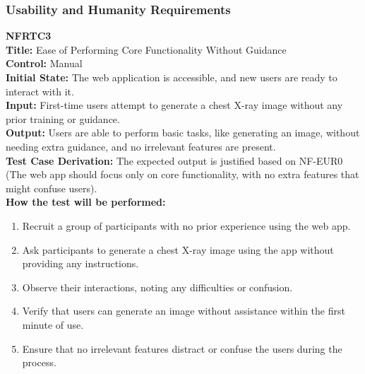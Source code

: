 \documentclass[12pt, titlepage]{article}
\begin{document}
\subsubsection{Usability and Humanity Requirements}
\textbf{NFRTC3}\\
\textbf{Title:} Ease of Performing Core Functionality Without Guidance\\
\textbf{Control:} Manual\\
\textbf{Initial State:} The web application is accessible, and new users are ready to interact with it.\\
\textbf{Input:} First-time users attempt to generate a chest X-ray image without any prior training or guidance.\\
\textbf{Output:} Users are able to perform basic tasks, like generating an image, without needing extra guidance, and no irrelevant features are present.\\
\textbf{Test Case Derivation:} The expected output is justified based on NF-EUR0 (The web app should focus only on core functionality, with no extra features that might confuse users).\\
\textbf{How the test will be performed:}
\begin{enumerate}
  \item Recruit a group of participants with no prior experience using the web app.
  \item Ask participants to generate a chest X-ray image using the app without providing any instructions.
  \item Observe their interactions, noting any difficulties or confusion.
  \item Verify that users can generate an image without assistance within the first minute of use.
  \item Ensure that no irrelevant features distract or confuse the users during the process.
\end{enumerate}
\vspace{1em}
\end{document}
